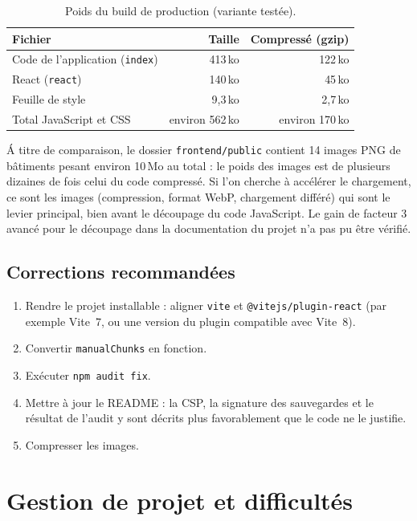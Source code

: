 \documentclass[11pt,a4paper]{report}
\newcommand{\file}[1]{\texttt{\nolinkurl{#1}}}
\begin{document}
\begin{table}[H]
\centering
\small
\begin{tabular}{@{}lrr@{}}
\toprule
\textbf{Fichier} & \textbf{Taille} & \textbf{Compress\'e (gzip)} \\
\midrule
Code de l'application (\texttt{index}) & 413\,ko & 122\,ko \\
React (\texttt{react}) & 140\,ko & 45\,ko \\
Feuille de style & 9,3\,ko & 2,7\,ko \\
\midrule
Total JavaScript et CSS & environ 562\,ko & environ 170\,ko \\
\bottomrule
\end{tabular}
\caption{Poids du build de production (variante test\'ee).}
\end{table}

\'A titre de comparaison, le dossier \file{frontend/public} contient 14 images PNG de
b\^atiments pesant environ 10\,Mo au total : le poids des images est de plusieurs dizaines
de fois celui du code compress\'e. Si l'on cherche \`a acc\'el\'erer le chargement, ce sont
les images (compression, format WebP, chargement diff\'er\'e) qui sont le levier principal,
bien avant le d\'ecoupage du code JavaScript. Le gain de \og facteur 3 \fg{} avanc\'e pour le
d\'ecoupage dans la documentation du projet n'a pas pu \^etre v\'erifi\'e.

\section{Corrections recommand\'ees}

\begin{enumerate}
  \item Rendre le projet installable : aligner \texttt{vite} et
        \texttt{@vitejs/plugin-react} (par exemple Vite~7, ou une version du plugin
        compatible avec Vite~8).
  \item Convertir \texttt{manualChunks} en fonction.
  \item Ex\'ecuter \texttt{npm audit fix}.
  \item Mettre \`a jour le README : la CSP, la signature des sauvegardes et le r\'esultat
        de l'audit y sont d\'ecrits plus favorablement que le code ne le justifie.
  \item Compresser les images.
\end{enumerate}

\chapter{Gestion de projet et difficult\'es}
\label{chap:projet}
\end{document}
